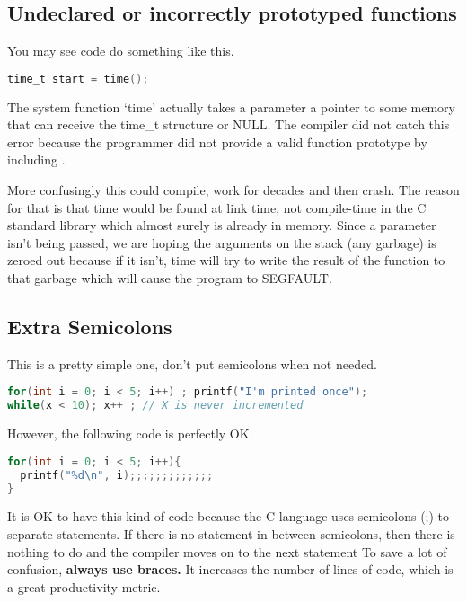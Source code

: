 \subsection{Undeclared or incorrectly prototyped functions}

You may see code do something like this.

\begin{lstlisting}[language=C]
time_t start = time();
\end{lstlisting}

The system function `time' actually takes a parameter a pointer to some memory that can receive the time\_t structure or NULL.
The compiler did not catch this error because the programmer did not provide a valid function prototype by including .

More confusingly this could compile, work for decades and then crash.
The reason for that is that time would be found at link time, not compile-time in the C standard library which almost surely is already in memory.
Since a parameter isn't being passed, we are hoping the arguments on the stack (any garbage) is zeroed out because if it isn't, time will try to write the result of the function to that garbage which will cause the program to SEGFAULT.

\subsection{Extra Semicolons}

This is a pretty simple one, don't put semicolons when not needed.

\begin{lstlisting}[language=C]
for(int i = 0; i < 5; i++) ; printf("I'm printed once");
while(x < 10); x++ ; // X is never incremented
\end{lstlisting}

However, the following code is perfectly OK.

\begin{lstlisting}[language=C]
for(int i = 0; i < 5; i++){
  printf("%d\n", i);;;;;;;;;;;;;
}
\end{lstlisting}

It is OK to have this kind of code because the C language uses semicolons (;) to separate statements.
If there is no statement in between semicolons, then there is nothing to do and the compiler moves on to the next statement
To save a lot of confusion, \textbf{always use braces.}
It increases the number of lines of code, which is a great productivity metric.


